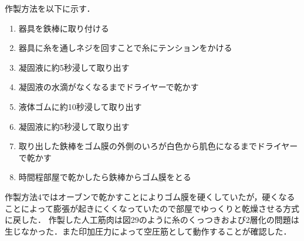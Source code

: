 作製方法を以下に示す．
\begin{enumerate}
  \item 器具を鉄棒に取り付ける
  \item 器具に糸を通しネジを回すことで糸にテンションをかける
  \item 凝固液に約5秒浸して取り出す
  \item 凝固液の水滴がなくなるまでドライヤーで乾かす
  \item 液体ゴムに約10秒浸して取り出す
  \item 凝固液に約5秒浸して取り出す
  \item 取り出した鉄棒をゴム膜の外側のいろが白色から肌色になるまでドライヤーで乾かす
　\item 時間程部屋で乾かしたら鉄棒からゴム膜をとる
\end{enumerate}
作製方法4ではオーブンで乾かすことによりゴム膜を硬くしていたが，硬くなることによって膨張が起きにくくなっていたので部屋でゆっくりと乾燥させる方式に戻した．
作製した人工筋肉は図29のように糸のくっつきおよび2層化の問題は生じなかった．また印加圧力によって空圧筋として動作することが確認した．

　


